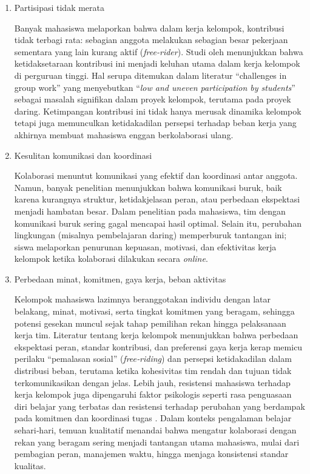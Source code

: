 \begin{enumerate}
\item {Partisipasi tidak merata}

Banyak mahasiswa melaporkan bahwa dalam kerja kelompok, kontribusi tidak terbagi rata: sebagian anggota melakukan sebagian besar pekerjaan sementara yang lain kurang aktif (\textit{free-rider}). Studi oleh \textcite{changWhenGroupWork2018} menunjukkan bahwa ketidaksetaraan kontribusi ini menjadi keluhan utama dalam kerja kelompok di perguruan tinggi. Hal serupa ditemukan dalam literatur “challenges in group work” yang menyebutkan “\textit{low and uneven participation by students}” sebagai masalah signifikan dalam proyek kelompok, terutama pada proyek daring. Ketimpangan kontribusi ini tidak hanya merusak dinamika kelompok tetapi juga memunculkan ketidakadilan persepsi terhadap beban kerja yang akhirnya membuat mahasiswa enggan berkolaborasi ulang.

\item{Kesulitan komunikasi dan koordinasi}

Kolaborasi menuntut komunikasi yang efektif dan koordinasi antar anggota. Namun, banyak penelitian menunjukkan bahwa komunikasi buruk, baik karena kurangnya struktur, ketidakjelasan peran, atau perbedaan ekspektasi menjadi hambatan besar. Dalam penelitian \textcite{pangSociallyChallengedCollaborative2018} pada mahasiswa, tim dengan komunikasi buruk sering gagal mencapai hasil optimal. Selain itu, perubahan lingkungan (misalnya pembelajaran daring) memperburuk tantangan ini; siswa melaporkan penurunan kepuasan, motivasi, dan efektivitas kerja kelompok ketika kolaborasi dilakukan secara \textit{online}.

\item{Perbedaan minat, komitmen, gaya kerja, beban aktivitas}

Kelompok mahasiswa lazimnya beranggotakan individu dengan latar belakang, minat, motivasi, serta tingkat komitmen yang beragam, sehingga potensi gesekan muncul sejak tahap pemilihan rekan hingga pelaksanaan kerja tim. Literatur tentang kerja kelompok menunjukkan bahwa perbedaan ekspektasi peran, standar kontribusi, dan preferensi gaya kerja kerap memicu perilaku “pemalasan sosial” (\textit{free‑riding}) dan persepsi ketidakadilan dalam distribusi beban, terutama ketika kohesivitas tim rendah dan tujuan tidak terkomunikasikan dengan jelas. Lebih jauh, resistensi mahasiswa terhadap kerja kelompok juga dipengaruhi faktor psikologis seperti rasa penguasaan diri belajar yang terbatas dan resistensi terhadap perubahan yang berdampak pada komitmen dan koordinasi tugas \textcite{sulisRESISTANCECHANGEMAHASISWA2020}. Dalam konteks pengalaman belajar sehari‑hari, temuan kualitatif menandai bahwa mengatur kolaborasi dengan rekan yang beragam sering menjadi tantangan utama mahasiswa, mulai dari pembagian peran, manajemen waktu, hingga menjaga konsistensi standar kualitas. 


\end{enumerate}
